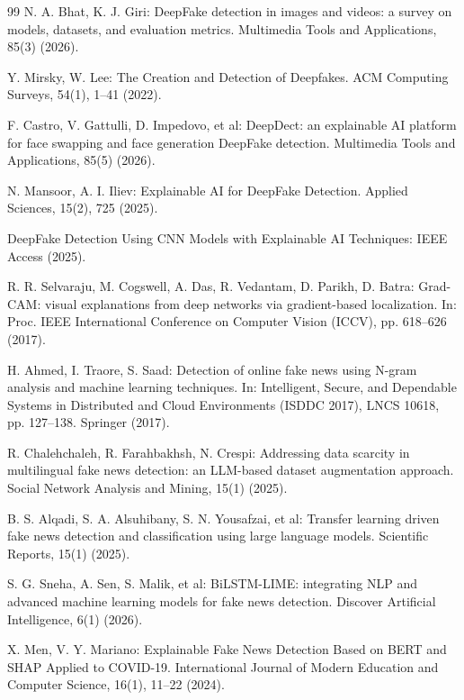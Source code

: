\documentclass[runningheads]{llncs}
\begin{document}
\begin{thebibliography}{99}
N. A. Bhat, K. J. Giri: DeepFake detection in images and videos: a survey on models, datasets, and evaluation metrics. Multimedia Tools and Applications, 85(3) (2026). 

Y. Mirsky, W. Lee: The Creation and Detection of Deepfakes. ACM Computing Surveys, 54(1), 1–41 (2022). 

F. Castro, V. Gattulli, D. Impedovo, et al: DeepDect: an explainable AI platform for face swapping and face generation DeepFake detection. Multimedia Tools and Applications, 85(5) (2026). 

N. Mansoor, A. I. Iliev: Explainable AI for DeepFake Detection. Applied Sciences, 15(2), 725 (2025). 

DeepFake Detection Using CNN Models with Explainable AI Techniques: IEEE Access (2025). 

R. R. Selvaraju, M. Cogswell, A. Das, R. Vedantam, D. Parikh, D. Batra: Grad-CAM: visual explanations from deep networks via gradient-based localization. In: Proc. IEEE International Conference on Computer Vision (ICCV), pp. 618--626 (2017).

H. Ahmed, I. Traore, S. Saad: Detection of online fake news using N-gram analysis and machine learning techniques. In: Intelligent, Secure, and Dependable Systems in Distributed and Cloud Environments (ISDDC 2017), LNCS 10618, pp. 127--138. Springer (2017).

R. Chalehchaleh, R. Farahbakhsh, N. Crespi: Addressing data scarcity in multilingual fake news detection: an LLM-based dataset augmentation approach. Social Network Analysis and Mining, 15(1) (2025). 

B. S. Alqadi, S. A. Alsuhibany, S. N. Yousafzai, et al: Transfer learning driven fake news detection and classification using large language models. Scientific Reports, 15(1) (2025). 

S. G. Sneha, A. Sen, S. Malik, et al: BiLSTM-LIME: integrating NLP and advanced machine learning models for fake news detection. Discover Artificial Intelligence, 6(1) (2026). 

X. Men, V. Y. Mariano: Explainable Fake News Detection Based on BERT and SHAP Applied to COVID-19. International Journal of Modern Education and Computer Science, 16(1), 11–22 (2024). 


\end{thebibliography}
\end{document}
